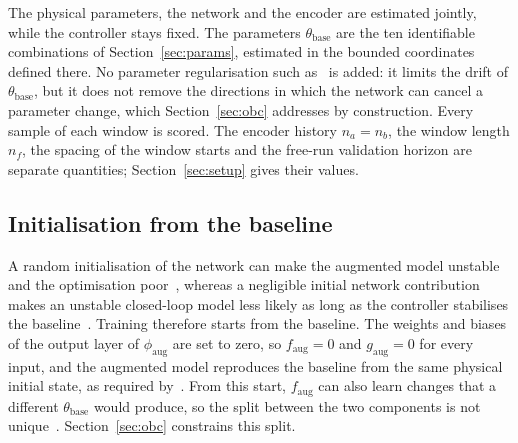 The physical parameters, the network and the encoder are estimated jointly,
while the controller stays fixed.
The parameters $\theta_{\mathrm{base}}$ are the ten identifiable
combinations of Section~\ref{sec:params}, estimated in the bounded
coordinates defined there.
No parameter regularisation such as~\cite[Eq.~(26)]{hoekstra2026lfr} is
added: it limits the drift of $\theta_{\mathrm{base}}$, but it does not
remove the directions in which the network can cancel a parameter change,
which Section~\ref{sec:obc} addresses by construction.
Every sample of each window is scored.
The encoder history $n_a=n_b$, the window length $n_f$, the spacing of the
window starts and the free-run validation horizon are separate quantities;
Section~\ref{sec:setup} gives their values.

\subsection{Initialisation from the baseline}\label{sec:aug_init}
A random initialisation of the network can make the augmented model
unstable and the optimisation poor~\cite[Sec.~5.4]{hoekstra2026lfr}, whereas
a negligible initial network contribution makes an unstable closed-loop
model less likely as long as the controller stabilises the
baseline~\cite[Sec.~5.2.3]{kessels2025ai}.
Training therefore starts from the baseline.
The weights and biases of the output layer of $\phi_{\mathrm{aug}}$ are set
to zero, so $f_{\mathrm{aug}}=0$ and $g_{\mathrm{aug}}=0$ for every input,
and the augmented model reproduces the baseline from the same physical
initial state, as required by~\cite[Eq.~(29)]{hoekstra2026lfr}.
From this start, $f_{\mathrm{aug}}$ can also learn changes that a different
$\theta_{\mathrm{base}}$ would produce, so the split between the two
components is not unique~\cite[Sec.~5.2]{hoekstra2026lfr}.
Section~\ref{sec:obc} constrains this split.


